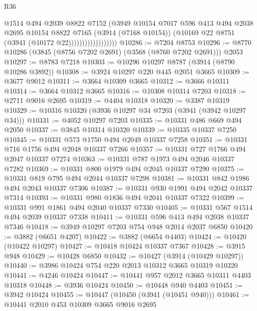 \begin{lexlean}{R36}
\begin{coremodule}
                                @1514
                                @494
                                @2039
                                @8822
                                @7152
                                (@3949
                                  @10154
                                  @7017
                                  @596
                                  @413
                                  @494
                                  @2038
                                  @2695
                                  @10154
                                  @8822
                                  @7165
                                  (@3914 (@7168 @10154))
                                  (@10169 @22 @8751 (@3941 (@10172 @22))))))))))))))))))
@10286 := @7204 @8753
@10296 := @8770 @10286 (@3845 (@8756 @7202 @2691) (@3568 (@8760 @7202 @2691))) @2053
@10297 := @8783 @7218
@10303 := @10296 @10297 @8787 (@3914 (@8790 @10286 @3892))
@10308 := @3924 @10297 @220 @445 @2051 @3665
@10309 := @3677 @9012
@10311 := @3664 @10309 @3665
@10312 := @3666 @10311
@10314 := @3664 @10312 @3665
@10316 := @10308 @10314 @7203
@10318 := @2711 @9016 @2695
@10319 := @4404 @10318
@10320 := @3387 @10319
@10329 := @10316 @10320 (@3936 @10297 @34 @7203 (@3941 (@3942 @10297 @34)))
@10331 := @4052 @10297 @7203
@10335 := @10331 @486 @669 @494 @2050
@10337 := @3845 @10314 @10320
@10339 := @10335 @10337 @7250
@10345 := @10331 @573 @1750 @494 @2049 @10337 @7258
@10351 := @10331 @716 @1756 @494 @2048 @10337 @7266
@10357 := @10331 @727 @1766 @494 @2047 @10337 @7274
@10363 := @10331 @787 @1973 @494 @2046 @10337 @7282
@10369 := @10331 @800 @1979 @494 @2045 @10337 @7290
@10375 := @10331 @819 @795 @494 @2044 @10337 @7298
@10381 := @10331 @842 @1986 @494 @2043 @10337 @7306
@10387 := @10331 @930 @1991 @494 @2042 @10337 @7314
@10393 := @10331 @980 @1836 @494 @2041 @10337 @7322
@10399 := @10331 @991 @1861 @494 @2040 @10337 @7330
@10405 := @10331 @567 @1514 @494 @2039 @10337 @7338
@10411 := @10331 @596 @413 @494 @2038 @10337 @7346
@10418 := @3949 @10297 @7203 @754 @948 @2014 @2037 @6850
@10420 := @3882 (@6651 @4207)
@10422 := @3882 (@6654 @4403)
@10424 := @10420 (@10422 @10297)
@10427 := @10418 @10424 @10337 @7367
@10428 := @3915 @948
@10429 := @10428 @6850
@10432 := @10427 (@3914 (@10429 @10297))
@10440 := @3986 @10424 @754 @220 @2013 @10312 @3665 @10319 @10320
@10441 := @4246 @10424
@10447 := @10441 @957 @2012 @3665 @10311 @4403 @10318
@10448 := @3936 @10424
@10450 := @10448 @940 @4403
@10451 := @3942 @10424
@10455 := @10447 (@10450 (@3941 (@10451 @940)))
@10461 := @10441 @2010 @453 @10309 @3665 @9016 @2695

\end{coremodule}
\end{lexlean}
